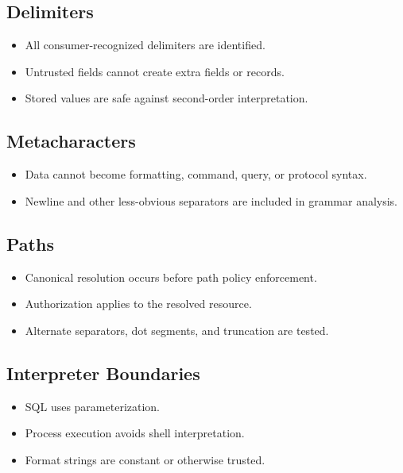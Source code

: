 \documentclass[11pt]{article}
\newcommand{\checkbox}{\(\square\)}
\begin{document}
\subsection*{Delimiters}
\begin{itemize}
  \item[\checkbox] All consumer-recognized delimiters are identified.
  \item[\checkbox] Untrusted fields cannot create extra fields or records.
  \item[\checkbox] Stored values are safe against second-order interpretation.
\end{itemize}

\subsection*{Metacharacters}
\begin{itemize}
  \item[\checkbox] Data cannot become formatting, command, query, or protocol syntax.
  \item[\checkbox] Newline and other less-obvious separators are included in grammar analysis.
\end{itemize}

\subsection*{Paths}
\begin{itemize}
  \item[\checkbox] Canonical resolution occurs before path policy enforcement.
  \item[\checkbox] Authorization applies to the resolved resource.
  \item[\checkbox] Alternate separators, dot segments, and truncation are tested.
\end{itemize}

\subsection*{Interpreter Boundaries}
\begin{itemize}
  \item[\checkbox] SQL uses parameterization.
  \item[\checkbox] Process execution avoids shell interpretation.
  \item[\checkbox] Format strings are constant or otherwise trusted.
\end{itemize}
\end{document}
